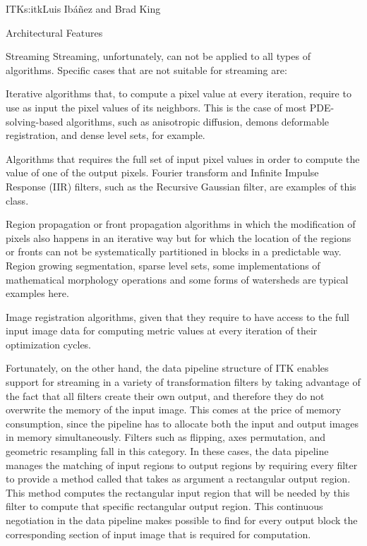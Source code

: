 \begin{aosachapter}{ITK}{s:itk}{Luis Ib\'{a}\~{n}ez and Brad King}
\begin{aosasect1}{Architectural Features}
\begin{aosasect2}{Streaming}
Streaming, unfortunately, can not be applied to all types of algorithms. Specific
cases that are not suitable for streaming are:

\begin{aosaitemize}
\item Iterative algorithms that, to compute a pixel value at every iteration,
require to use as input the pixel values of its neighbors. This is the case of
most PDE-solving-based algorithms, such as anisotropic diffusion, demons
deformable registration, and dense level sets, for example.
\item Algorithms that requires the full set of input pixel values in order to
compute the value of one of the output pixels. Fourier transform and Infinite
Impulse Response (IIR) filters, such as the Recursive Gaussian filter, are
examples of this class.
\item Region propagation or front propagation algorithms in which the
modification of pixels also happens in an iterative way but for which the
location of the regions or fronts can not be systematically partitioned in
blocks in a predictable way. Region growing segmentation, sparse level sets,
some implementations of mathematical morphology operations and some forms of
watersheds are typical examples here.
\item Image registration algorithms, given that they require to have access to
the full input image data for computing metric values at every iteration of
their optimization cycles.
\end{aosaitemize}

Fortunately, on the other hand, the data pipeline structure of ITK enables
support for streaming in a variety of transformation filters by taking
advantage of the fact that all filters create their own output, and therefore
they do not overwrite the memory of the input image. This comes at the price of
memory consumption, since the pipeline has to allocate both the input and
output images in memory simultaneously. Filters such as flipping, axes
permutation, and geometric resampling fall in this category. In these cases,
the data pipeline manages the matching of input regions to output regions by
requiring every filter to provide a method called
 that takes as argument a rectangular
output region. This method computes the rectangular input region that will be
needed by this filter to compute that specific rectangular output region. This
continuous negotiation in the data pipeline makes possible to find for every
output block the corresponding section of input image that is required for
computation.


\end{aosasect2}
\end{aosasect1}
\end{aosachapter}
